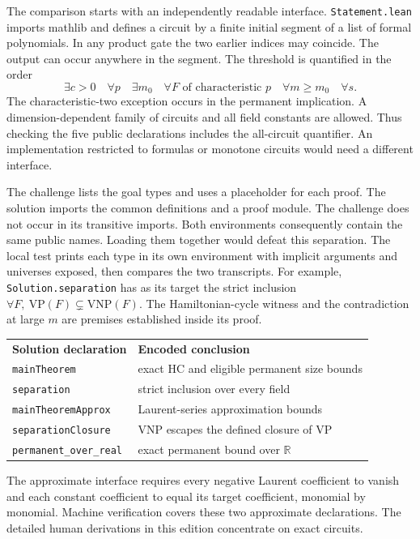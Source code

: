 \clearpage
{}\label{sec:14formal}
The comparison starts with an independently readable interface. \texttt{Statement.lean} imports mathlib and defines a circuit by a finite initial segment of a list of formal polynomials. In any product gate the two earlier indices may coincide. The output can occur anywhere in the segment. The threshold is quantified in the order
\[
 \exists c>0\quad \forall p\quad\exists m_0\quad
 \forall F\text{ of characteristic }p\quad\forall m\ge m_0\quad\forall s.
\]
The characteristic-two exception occurs in the permanent implication. A dimension-dependent family of circuits and all field constants are allowed. Thus checking the five public declarations includes the all-circuit quantifier. An implementation restricted to formulas or monotone circuits would need a different interface.

The challenge lists the goal types and uses a placeholder for each proof. The solution imports the common definitions and a proof module. The challenge does not occur in its transitive imports. Both environments consequently contain the same public names. Loading them together would defeat this separation. The local test prints each type in its own environment with implicit arguments and universes exposed, then compares the two transcripts. For example, \texttt{Solution.separation} has as its target the strict inclusion $\forall F,\ \mathrm{VP}(F)\subsetneq\mathrm{VNP}(F)$. The Hamiltonian-cycle witness and the contradiction at large $m$ are premises established inside its proof.
\begin{center}
\begin{tabular}{@{}ll@{}}
\textbf{Solution declaration} & \textbf{Encoded conclusion}\\
\texttt{mainTheorem} & exact HC and eligible permanent size bounds\\
\texttt{separation} & strict inclusion over every field\\
\texttt{mainTheoremApprox} & Laurent-series approximation bounds\\
\texttt{separationClosure} & VNP escapes the defined closure of VP\\
\texttt{permanent\_over\_real} & exact permanent bound over $\mathbb R$
\end{tabular}
\end{center}
The approximate interface requires every negative Laurent coefficient to vanish and each constant coefficient to equal its target coefficient, monomial by monomial. Machine verification covers these two approximate declarations. The detailed human derivations in this edition concentrate on exact circuits.


